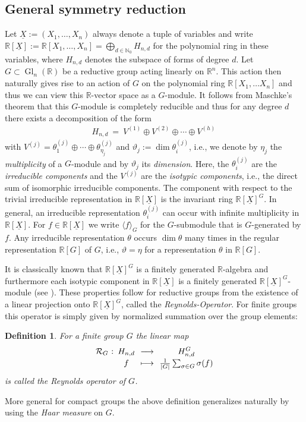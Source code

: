 \documentclass[11pt,a4paper]{amsart}
\newcommand{\abb}[5]{%
\setlength{\arraycolsep}{0.4ex}%
\begin{array}{rcccc}%
#1 &:\,& #2 & \,\,\longrightarrow\,\, & #3 \\[0.5ex]%
     & & #4 & \longmapsto & #5%
\end{array}%
}
\numberwithin{equation}{section}
\newtheorem{definition}[thm]{Definition}
\theoremstyle{definition}
\newcommand{\N}{\mathbb{N}}
\newcommand{\R}{\mathbb{R}}
\DeclareMathOperator{\Gl}{Gl}
\numberwithin{thm}{section}
\theoremstyle{break}
\numberwithin{subcase}{case}
\begin{document}
\subsection{General symmetry reduction}
Let $\underline{X}:=(X_1,\ldots,X_n)$ always denote a tuple of variables and write $\R[\underline{X}]:=\R[X_1,\ldots,X_n]=\bigoplus_{d \in \N_0}H_{n,d}$ for the polynomial ring in these variables, where $H_{n,d}$ denotes the subspace of forms of degree $d$. Let $G\subset \Gl_n(\R)$ be a reductive group acting linearly on $\R^n$. This action then naturally gives rise to an action of $G$ on the polynomial ring $\R[X_1,\ldots X_n]$ and thus we can view this $\R$-vector space  as a $G$-module. It follows from Maschke's theorem that this $G$-module is completely reducible and thus for any degree $d$ there exists a decomposition of the form
\begin{eqnarray}\label{eq:decomp}
H_{n,d} \ = \ V^{(1)} \oplus V^{(2)} \oplus \cdots \oplus V^{(h)} \,
\end{eqnarray}
with $V^{(j)} = \theta^{(j)}_1 \oplus \cdots \oplus \theta^{(j)}_{\eta_j}$ and $\vartheta_j := \dim \theta^{(j)}_i$, i.e., we denote by $\eta_j$ the \emph{multiplicity} of a $G$-module and by $\vartheta_j$ its \emph{dimension}. 
Here, the $\theta^{(j)}_i$ are the \emph{irreducible components} and the $V^{(j)}$ are the \emph{isotypic components}, i.e., the direct sum of isomorphic irreducible components. The component with respect to the trivial irreducible
representation in $\R[\underline{X}]$ is the invariant ring $\R[\underline{X}]^G$. In general, an irreducible representation $\theta_i^{(j)}$ can occur with infinite multiplicity in $\R[\underline{X}].$ For $f \in \R[\underline{X}]$ we write $\langle f \rangle_G$ for the $G$-submodule that is $G$-generated by $f$. Any irreducible representation $\theta$ occurs $\dim \theta$ many times in the regular representation $\R[G]$ of $G$, i.e., $\vartheta = \eta$ for a representation $\theta$ in $\R[G]$.


It is classically known that $\R[\underline{X}]^G$ is a finitely generated $\R$-algebra and furthermore each isotypic component in $\R[\underline{X}]$ is a finitely generated $\R[\underline{X}]^{G}$-module (see \cite[Theorem 1.3]{stanley}). These properties follow for reductive groups from the existence of a linear projection onto $\R[\underline{X}]^G$, called the \emph{Reynolds-Operator}. For finite groups this operator is simply given by normalized summation over the group elements:
\begin{definition}
For a finite group $G$ the linear map $$\abb{\mathcal{R}_G}{H_{n,d}}{H_{n,d}^G}{f}{\frac{1}{|G|}\sum_{\sigma\in G}\sigma(f)}$$ is called the Reynolds operator of $G$. 
\end{definition}
More general for compact groups the above definition generalizes naturally by using the \emph{Haar measure} on $G$.
\end{document}
